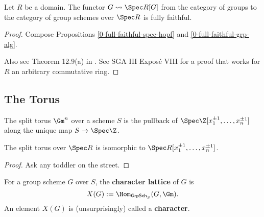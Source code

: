 \begin{theorem}
  \label{0-full-faithful-spec-grp-alg}
  \leanok

  Let $R$ be a domain.
  The functor $G \rightsquigarrow \Spec R[G]$ from the category of groups to the category of group schemes over $\Spec R$ is fully faithful.
\end{theorem}
\begin{proof}
  \leanok

  Compose Propositions \ref{0-full-faithful-spec-hopf} and \ref{0-full-faithful-grp-alg}.

  Also see Theorem 12.9(a) in \cite{Milne_2017}. See SGA III Exposé VIII for a proof that works for $R$ an arbitrary commutative ring.
\end{proof}


\subsection{The Torus}


\begin{definition}
  \label{0-torus}
  \leanok

  The split torus $\Gm^n$ over a scheme $S$ is the pullback of
  $\Spec \Z[x_1^{\pm 1}, \dotsc, x_n^{\pm 1}]$ along the unique map $S \to \Spec \Z$.
\end{definition}


\begin{lemma}
  \label{0-torus-spec}
  \leanok

  The split torus over $\Spec R$ is isomorphic to $\Spec R[x_1^{\pm 1}, \dotsc, x_n^{\pm 1}]$.
\end{lemma}
\begin{proof}
  \uses{}

  Ask any toddler on the street.
\end{proof}


\begin{definition}
  \label{0-char}
  \leanok

  For a group scheme $G$ over $S$, the {\bf character lattice} of $G$ is
  \[
    X(G) := \Hom_{\mathsf{GrpSch}_S}(G, \Gm).
  \]
  An element $X(G)$ is (unsurprisingly) called a {\bf character}.
\end{definition}


